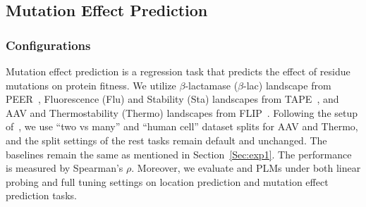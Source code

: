 \begin{table*}[!ht]
\begin{minipage}{0.49\textwidth}
    \label{Tab:sim_PPI}
    \begin{center}
    \vspace{-1em}
    \end{center}
\end{minipage}
\end{table*}
\subsection{Mutation Effect Prediction}
\subsubsection{Configurations}
Mutation effect prediction is a regression task that predicts the effect of residue mutations on protein fitness. We utilize $\beta$-lactamase ($\beta$-lac) landscape from PEER~\cite{PEER}, Fluorescence (Flu) and Stability (Sta) landscapes from TAPE~\cite{TAPE}, and AAV and Thermostability (Thermo) landscapes from FLIP~\cite{FLIP}. Following the setup of~\cite{ProtST}, we use ``two vs many'' and ``human cell'' dataset splits for AAV and Thermo, and the split settings of the rest tasks remain default and unchanged.
The baselines remain the same as mentioned in Section~\ref{Sec:exp1}. The performance is measured by Spearman’s $\rho$. 
Moreover, 
we evaluate \ourapproach and PLMs under both linear probing and full tuning settings on location prediction and mutation effect prediction tasks.


